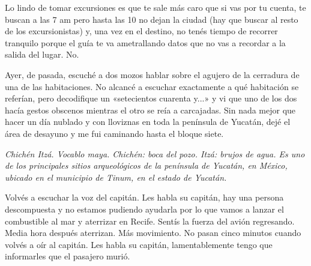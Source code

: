\documentclass[12pt,twoside,openright,a5paper]{book}
\begin{document}
\vspace{0.5cm}

\hrulefill\hspace{0.2cm} \decofourleft\decofourright \hspace{0.2cm} \hrulefill
\vspace{0.5cm}

Lo lindo de tomar excursiones es que te sale más caro que si vas por tu
cuenta, te buscan a las 7 am pero hasta las 10 no dejan la ciudad (hay que
buscar al resto de los excursionistas) y, una vez en el destino, no tenés
tiempo de recorrer tranquilo porque el guía te va ametrallando datos que
no vas a recordar a la salida del lugar. No.

\vspace{0.5cm}

\hrulefill\hspace{0.2cm} \decofourleft\decofourright \hspace{0.2cm} \hrulefill
\vspace{0.5cm}

Ayer, de pasada, escuché a dos mozos hablar sobre el agujero de la cerradura de
una de las habitaciones. No alcancé a escuchar exactamente a qué habitación
se referían, pero decodifique un «setecientos cuarenta y...» y vi que uno
de los dos hacía gestos obscenos mientras el otro se reía a carcajadas. Sin
nada mejor que hacer un día nublado y con lloviznas en toda la península de
Yucatán, dejé el área de desayuno y me fui caminando hasta el bloque siete.

\vspace{0.5cm}

\hrulefill\hspace{0.2cm} \decofourleft\decofourright \hspace{0.2cm} \hrulefill
\vspace{0.5cm}

\emph{Chichén Itzá. Vocablo maya. Chichén: boca del pozo. Itzá: brujos de agua.
Es uno de los principales sitios arqueológicos de la península de Yucatán,
en México, ubicado en el municipio de Tinum, en el estado de Yucatán.}

\vspace{0.5cm}
\afterpage{}
\hrulefill\hspace{0.2cm} \decofourleft\decofourright \hspace{0.2cm} \hrulefill
\vspace{0.5cm}

Volvés a escuchar la voz del capitán. Les habla su capitán, hay una
persona descompuesta y no estamos pudiendo ayudarla por lo que vamos a
lanzar el combustible al mar y aterrizar en Recife. Sentís la fuerza del
avión regresando. Media hora después aterrizan. Más movimiento. No pasan
cinco minutos cuando volvés a oír al capitán. Les habla su capitán,
lamentablemente tengo que informarles que el pasajero murió.
\end{document}
